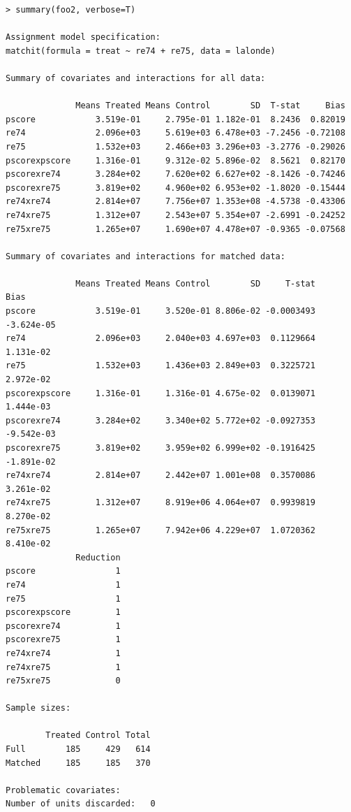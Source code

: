 \documentclass[oneside,letterpaper,titlepage]{article}
\begin{document}
\begin{verbatim}
> summary(foo2, verbose=T)
 
Assignment model specification:
matchit(formula = treat ~ re74 + re75, data = lalonde)
 
Summary of covariates and interactions for all data:
 
              Means Treated Means Control        SD  T-stat     Bias
pscore            3.519e-01     2.795e-01 1.182e-01  8.2436  0.82019
re74              2.096e+03     5.619e+03 6.478e+03 -7.2456 -0.72108
re75              1.532e+03     2.466e+03 3.296e+03 -3.2776 -0.29026
pscorexpscore     1.316e-01     9.312e-02 5.896e-02  8.5621  0.82170
pscorexre74       3.284e+02     7.620e+02 6.627e+02 -8.1426 -0.74246
pscorexre75       3.819e+02     4.960e+02 6.953e+02 -1.8020 -0.15444
re74xre74         2.814e+07     7.756e+07 1.353e+08 -4.5738 -0.43306
re74xre75         1.312e+07     2.543e+07 5.354e+07 -2.6991 -0.24252
re75xre75         1.265e+07     1.690e+07 4.478e+07 -0.9365 -0.07568
 
Summary of covariates and interactions for matched data:
 
              Means Treated Means Control        SD     T-stat       Bias
pscore            3.519e-01     3.520e-01 8.806e-02 -0.0003493 -3.624e-05
re74              2.096e+03     2.040e+03 4.697e+03  0.1129664  1.131e-02
re75              1.532e+03     1.436e+03 2.849e+03  0.3225721  2.972e-02
pscorexpscore     1.316e-01     1.316e-01 4.675e-02  0.0139071  1.444e-03
pscorexre74       3.284e+02     3.340e+02 5.772e+02 -0.0927353 -9.542e-03
pscorexre75       3.819e+02     3.959e+02 6.999e+02 -0.1916425 -1.891e-02
re74xre74         2.814e+07     2.442e+07 1.001e+08  0.3570086  3.261e-02
re74xre75         1.312e+07     8.919e+06 4.064e+07  0.9939819  8.270e-02
re75xre75         1.265e+07     7.942e+06 4.229e+07  1.0720362  8.410e-02
              Reduction
pscore                1
re74                  1
re75                  1
pscorexpscore         1
pscorexre74           1
pscorexre75           1
re74xre74             1
re74xre75             1
re75xre75             0
 
Sample sizes:
 
        Treated Control Total
Full        185     429   614
Matched     185     185   370
 
Problematic covariates:
Number of units discarded:   0
\end{verbatim}
\end{document}
